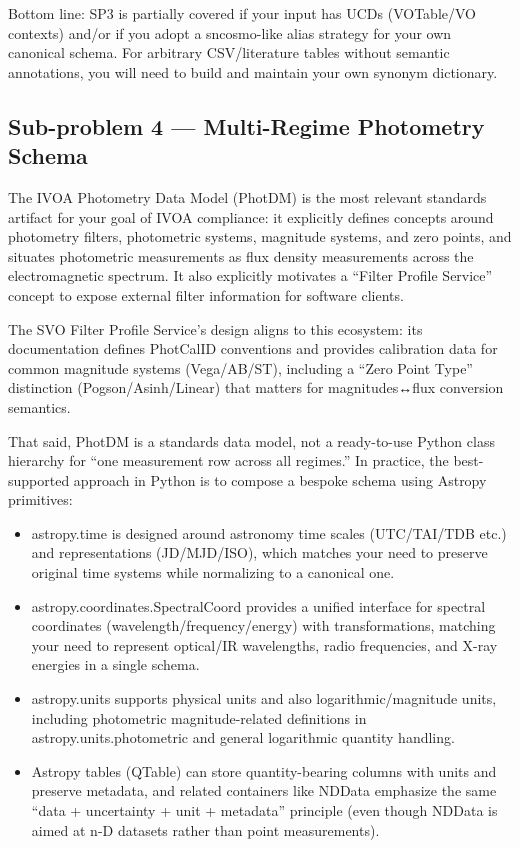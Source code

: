 \documentclass[twocolumn]{aastex701}
\begin{document}
Bottom line: SP3 is partially covered if your input has UCDs (VOTable/VO contexts) and/or if you adopt a sncosmo-like alias strategy for your own canonical schema. For arbitrary CSV/literature tables without semantic annotations, you will need to build and maintain your own synonym dictionary.

\subsection{Sub-problem 4 — Multi-Regime Photometry Schema}

The IVOA Photometry Data Model (PhotDM) is the most relevant standards artifact for your goal of IVOA compliance: it explicitly defines concepts around photometry filters, photometric systems, magnitude systems, and zero points, and situates photometric measurements as flux density measurements across the electromagnetic spectrum. It also explicitly motivates a “Filter Profile Service” concept to expose external filter information for software clients. \citep{ref27}

The SVO Filter Profile Service’s design aligns to this ecosystem: its documentation defines PhotCalID conventions and provides calibration data for common magnitude systems (Vega/AB/ST), including a “Zero Point Type” distinction (Pogson/Asinh/Linear) that matters for magnitudes↔flux conversion semantics. \citep{ref28}

That said, PhotDM is a standards data model, not a ready-to-use Python class hierarchy for “one measurement row across all regimes.” In practice, the best-supported approach in Python is to compose a bespoke schema using Astropy primitives:

\begin{itemize}
\item astropy.time is designed around astronomy time scales (UTC/TAI/TDB etc.) and representations (JD/MJD/ISO), which matches your need to preserve original time systems while normalizing to a canonical one. \citep{ref29}

\item astropy.coordinates.SpectralCoord provides a unified interface for spectral coordinates (wavelength/frequency/energy) with transformations, matching your need to represent optical/IR wavelengths, radio frequencies, and X-ray energies in a single schema. \citep{ref30}

\item astropy.units supports physical units and also logarithmic/magnitude units, including photometric magnitude-related definitions in astropy.units.photometric and general logarithmic quantity handling. \citep{ref31}

\item Astropy tables (QTable) can store quantity-bearing columns with units and preserve metadata, and related containers like NDData emphasize the same “data + uncertainty + unit + metadata” principle (even though NDData is aimed at n-D datasets rather than point measurements). \citep{ref32}
\end{itemize}
\end{document}
